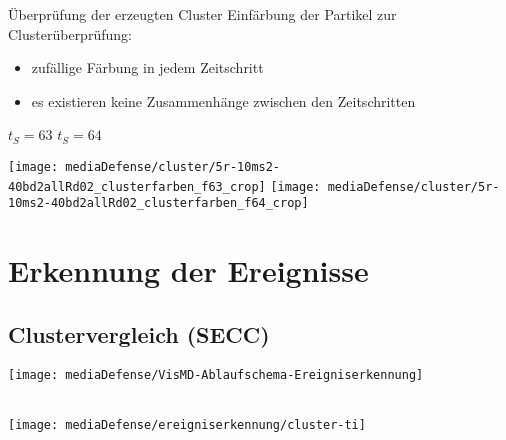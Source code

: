 \documentclass[10pt]{beamer}
\begin{document}
%
%
\begin{frame}{Überprüfung der erzeugten Cluster}
	Einfärbung der Partikel zur Clusterüberprüfung:
	\begin{itemize}
		\item zufällige Färbung in jedem Zeitschritt
		\item es existieren keine Zusammenhänge zwischen den Zeitschritten
	\end{itemize}
	
	{\scriptsize $t_S=63$}
	\hspace{.41\textwidth}
	{\scriptsize $t_S=64$}
	
	\texttt{[image: mediaDefense/cluster/5r-10ms2-40bd2allRd02\_clusterfarben\_f63\_crop]}%
	\hspace{.04\textwidth}%
	\texttt{[image: mediaDefense/cluster/5r-10ms2-40bd2allRd02\_clusterfarben\_f64\_crop]}
\end{frame}

\section{Erkennung der Ereignisse}

\subsection{Clustervergleich (SECC)}

%
%
\begin{wideframe}
	\texttt{[image: mediaDefense/VisMD-Ablaufschema-Ereigniserkennung]}
\end{wideframe}

%
%
% 
%
\begin{frame}
	\\
	\texttt{[image: mediaDefense/ereigniserkennung/cluster-ti]}
\end{frame}
\end{document}

